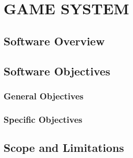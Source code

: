 \chapter{GAME SYSTEM}

\section{Software Overview}



\section{Software Objectives}

\subsection{General Objectives}


\subsection{Specific Objectives}



\section{Scope and Limitations}



